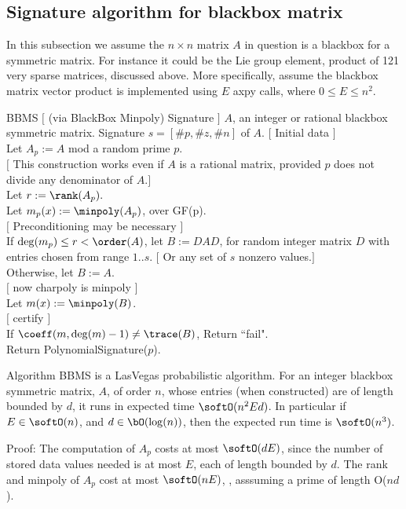 \subsection{Signature algorithm for blackbox matrix}
In this subsection we assume the $n\times n$ matrix $A$ in question is a 
blackbox for a symmetric matrix.  
For instance it could be the Lie group element, 
product of 121 very sparse matrices, discussed above.  
More specifically, assume the blackbox matrix vector product is implemented 
using $E$ axpy calls, where $0 \leq E \leq n^2$.

\begin{algorithm}{BBMS $[$ (via BlackBox Minpoly) Signature $]$}
\Inspec $A$, an integer or rational blackbox symmetric matrix.
\Outspec Signature $s = [\#p, \#z, \#n]$ of $A$.
\Stmt[1.] $[$ Initial data $]$\\
Let $A_p := A$ mod a random prime $p.$\\ 
$[$ This construction works even if $A$ is a rational matrix, provided $p$ does 
not divide any denominator of $A$.$]$\\
Let $r := \rank(A_p).$\\
Let $m_p(x) := \minpoly(A_p)$, over GF(p).\\ 
\Stmt[2.] $[$ Preconditioning may be necessary $]$\\
If $\deg(m_p) \leq r < \order(A)$, let $B := DAD$, for random integer matrix $D$ with entries chosen from
range $1..s$. $[$ Or any set of $s$ nonzero values.$]$\\
Otherwise, let $B := A$.\\
\Stmt[3.] $[$ now charpoly is minpoly $]$\\
Let $m(x) := \minpoly(B)$. \\
\Stmt[4.] $[$ certify $]$\\
If $\coeff(m, \deg(m)-1) \neq \trace(B)$, Return ``fail".\\
Return PolynomialSignature($p$).
\end{algorithm}

\begin{theorem}
Algorithm BBMS is a LasVegas probabilistic algorithm.
For an integer blackbox symmetric matrix, $A$,  
of order $n$, whose entries (when constructed) are of length bounded by $d$,
it runs in expected time 
$\softO(n^2 E d)$.
In particular if $E \in \softO(n)$, and $d \in \bO(\log(n))$,
then the expected run time is $\softO(n^3)$.
\end{theorem}

Proof:
The computation of $A_p$ costs at most $\softO(dE)$, since the number of stored data values
needed is at most $E$, each of length bounded by $d$.  The rank and minpoly of $A_p$ cost at most $\softO(nE)$, \cite{SSV04}, asssuming a prime of length O($nd$).  

